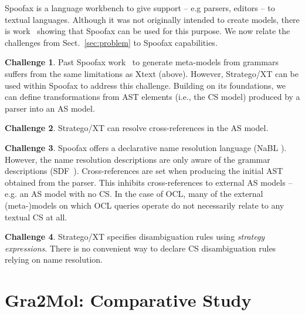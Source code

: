 \documentclass{llncs}
\begin{document}



Spoofax is a language workbench to give support -- e.g parsers, editors -- to textual languages. Although it was not originally intended to create models, there is  work~\cite{vanRest2013syncTextGraphEditors} showing that Spoofax can be used for this purpose. We now relate the challenges from Sect.~\ref{sec:problem} to Spoofax capabilities.

\textbf{Challenge 1}. Past Spoofax work~\cite{vanRest2013syncTextGraphEditors} to generate meta-models from grammars suffers from the same limitations as Xtext (above). However, Stratego/XT \cite{visser2004stratego} can be used within Spoofax to address this challenge. Building on its foundations, we can define transformations from AST elements (i.e., the CS model) produced by a parser into an AS model.

\textbf{Challenge 2}. Stratego/XT can resolve cross-references in the AS model.

\textbf{Challenge 3}. Spoofax offers a declarative name resolution language (NaBL \cite{konat2013decNameRes}). However, the name resolution descriptions are only aware of the grammar descriptions (SDF~\cite{kats2010sdf}). Cross-references are set when producing the initial AST obtained from the parser. This inhibits cross-references to external AS models -- e.g. an AS model with no CS. In the case of OCL, many of the external (meta-)models on which OCL queries operate do not necessarily relate to any textual CS at all.

\textbf{Challenge 4}. Stratego/XT specifies disambiguation rules using \textit{strategy expressions}. There is no convenient way to declare CS disambiguation rules relying on name resolution.

\section{Gra2Mol: Comparative Study}
\label{sec:gra2mol}
\end{document}
